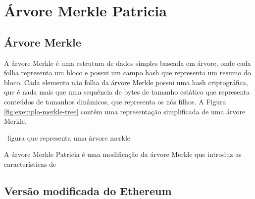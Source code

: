\chapter{Árvore Merkle Patricia}\label{annx:arvore-merkle-patricia}

\section{Árvore Merkle}

A árvore Merkle é uma estrutura de dados simples baseada em árvore, onde cada folha representa um bloco e possui um campo hash que representa um resumo do bloco. Cada elemento não folha da árvore Merkle possui uma hash criptográfica, que é nada mais que uma sequência de bytes de tamanho estático que representa conteúdos de tamanhos dinâmicos, que representa os nós filhos. A Figura \ref{fig:exemplo-merkle-tree} contém uma representação simplificada de uma árvore Merkle.

~figura que representa uma árvore merkle~

A árvore Merkle Patricia é uma modificação da árvore Merkle que introduz as características de 

\section{Versão modificada do Ethereum}